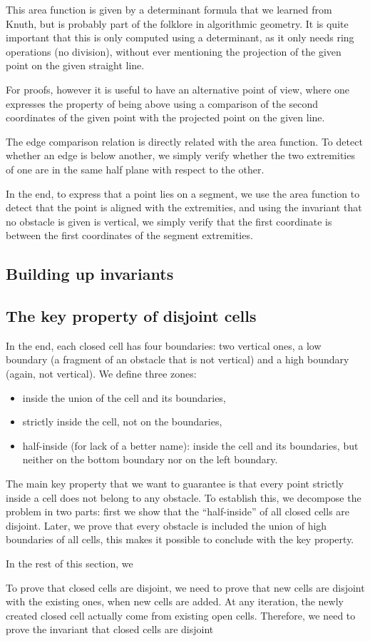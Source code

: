 \documentclass[a4paper, USenglish, cleveref, autoref, thm-restate]{lipics-v2021}
\begin{document}
This area function is given by a determinant formula that we learned
from Knuth, but is probably part of the folklore in algorithmic
geometry.  It is quite important that this is only computed using a
determinant, as it only needs ring operations (no division), without
ever mentioning the projection of the given point on the given
straight line.

For proofs, however it is useful to have an alternative point of view,
where one expresses the property of being above using a comparison of
the second coordinates of the given point with the projected point on
the given line.

The edge comparison relation is directly related with the area
function.  To detect whether an edge is below another, we simply
verify whether the two extremities of one are in the same half plane
with respect to the other.

In the end, to express that a point lies on a segment, we use the area
function to detect that the point is aligned with the extremities, and
using the invariant that no obstacle is given is vertical, we simply
verify that the first coordinate is between the first coordinates of
the segment extremities.
\subsection{Building up invariants}
\subsection{The key property of disjoint cells}
In the end, each closed cell has four boundaries: two vertical ones, a
low boundary (a fragment of an obstacle that is not vertical) and a
high boundary (again, not vertical).  We define three zones:
\begin{itemize}
\item inside the union of the cell and its boundaries,
\item strictly inside the cell, not on the boundaries,
\item half-inside (for lack of a better name): inside the cell and its
 boundaries, but neither on the bottom boundary nor on the left boundary.
\end{itemize}
The main key property that we want to guarantee is that every point
strictly inside a cell does not belong to any obstacle.  To establish
this, we decompose the problem in two parts: first we show
that the ``half-inside'' of all closed cells are disjoint.  Later, we
prove that every obstacle is included the union of high boundaries of
all cells, this makes it possible to conclude with the key property.

In the rest of this section, we 

To prove that closed cells are disjoint, we need to prove that new
cells are disjoint with the existing ones, when new cells are added.
At any iteration, the newly created closed cell actually come from
existing open cells.  Therefore, we need to prove the invariant that
closed cells are disjoint 
\end{document}
